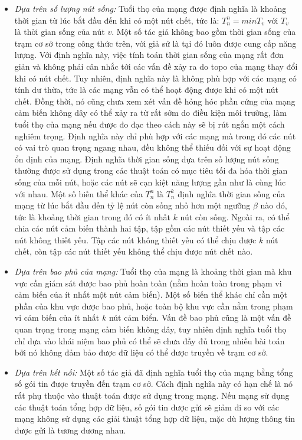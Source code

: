 \documentclass{article}
\begin{document}
\begin{itemize}
    \item \emph{Dựa trên số lượng nút sống: }
    Tuổi thọ của mạng được định nghĩa là khoảng thời gian từ lúc bắt đầu đến khi có một nút chết, tức là: $T^{n}_{n} = minT_{v}$ với $T_{v}$ là thời gian sống của nút $v$. Một số tác giả không bao gồm thời gian sống của trạm cơ sở trong công thức trên, với giả sử là tại đó luôn được cung cấp năng lượng. Với định nghĩa này, việc tính toán thời gian sống của mạng rất đơn giản và không phải cân nhắc tới các vấn đề xảy ra do topo của mạng thay đổi khi có  nút chết. Tuy nhiên, định nghĩa này là không phù hợp với các mạng có tính dư thừa, tức là các mạng vẫn có thể hoạt động được khi có một nút chết. Đồng thời, nó cũng chưa xem xét vấn đề hỏng hóc phần cứng của mạng cảm biến không dây có thể xảy ra từ rất sớm do điều kiện môi trường, làm tuổi thọ của mạng nếu được đo đạc theo cách này sẽ bị rút ngắn một cách nghiêm trọng.  Định nghĩa này chỉ phù hợp với các mạng mà trong đó các nút có vai trò quan trọng ngang nhau, đều không thể thiếu đối với sự hoạt động ổn định của mạng.
    Định nghĩa thời gian sống dựa trên số lượng nút sống thường được sử dụng trong các thuật toán có mục tiêu tối đa hóa thời gian sống của mỗi nút, hoặc các nút sẽ cạn kiệt năng lượng gần như là cùng lúc với nhau.
    \newline Một số biến thể khác của $T^{n}_{n}$ là $T^{k}_{n}$ định nghĩa thời gian sống của mạng từ lúc bắt đầu đến tỷ lệ nút còn sống nhỏ hơn một ngưỡng $\beta$ nào đó, tức là khoảng thời gian trong đó có ít nhất $k$ nút còn sống. Ngoài ra, có thể chia các nút cảm biến thành hai tập, tập gồm các  nút thiết yếu và tập các  nút không thiết yếu. Tập các nút không thiết yếu có thể chịu được $k$ nút chết, còn tập các nút thiết yếu  không thể chịu được nút chết nào. 
    \item \emph{Dựa trên bao phủ của mạng: }
    Tuổi thọ của mạng là khoảng thời gian mà khu vực cần giám sát được bao phủ hoàn toàn (nằm hoàn toàn trong phạm vi cảm biến của ít nhất một nút cảm biến). Một số biến thể khác chỉ cần một phần của khu vực được bao phủ, hoặc toàn bộ khu vực cần nằm trong phạm vi cảm biến của ít nhất $k$ nút cảm biển.
    Vấn đề bao phủ cũng là một vấn đề quan trọng trong mạng cảm biến không dây, tuy nhiên định nghĩa tuổi thọ chỉ dựa vào khái niệm bao phủ có thể sẽ chưa đầy đủ trong nhiều bài toán bởi nó không đảm bảo được đữ liệu có thể được truyền về trạm cơ sở.
    \item \emph{Dựa trên kết nối: }
    Một số tác giả đã định nghĩa tuổi thọ của mạng  bằng tổng số gói tin được truyền đến trạm cơ sở. Cách định nghĩa này có hạn chế là nó rất phụ thuộc vào thuật toán được sử dụng trong mạng. Nếu mạng sử dụng các thuật toán tổng hợp dữ liệu, số gói tin được gửi sẽ giảm đi so với các mạng không sử dụng các giải thuật tổng hợp dữ liệu, mặc dù lượng thông tin được gửi là tương đương nhau.

\end{itemize}
\end{document}
